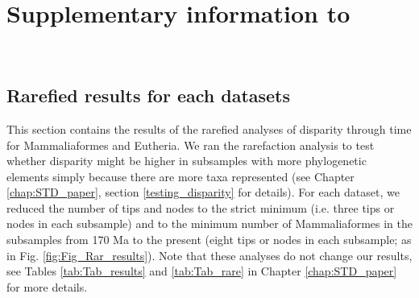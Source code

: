 \chapter{Supplementary information to }
\label{chap:Appendix_STD}

\bigskip
\medskip
\begin{center}

 \\
\bigskip
\end{center}

\section{Rarefied results for each datasets}
This section contains the results of the rarefied analyses of disparity through time for Mammaliaformes and Eutheria.
We ran the rarefaction analysis to test whether disparity might be higher in subsamples with more phylogenetic elements simply because there are more taxa represented (see Chapter \ref{chap:STD_paper}, section \ref{testing_disparity} for details).
For each dataset, we reduced the number of tips and nodes to the strict minimum (i.e. three tips or nodes in each subsample) and to the minimum number of Mammaliaformes in the subsamples from 170 Ma to the present (eight tips or nodes in each subsample; as in Fig. \ref{fig:Fig_Rar_results}).
Note that these analyses do not change our results, see Tables \ref{tab:Tab_results} and \ref{tab:Tab_rare} in Chapter \ref{chap:STD_paper} for more details.

